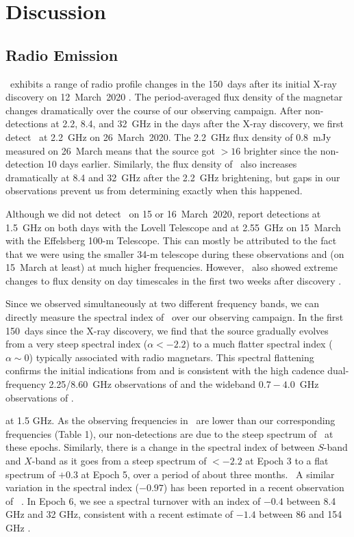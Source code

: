 \documentclass[twocolumn]{emulateapj}
\begin{document}
\section{Discussion}
\label{sec:discussion}
\subsection{Radio Emission}
\label{ssec:radio_em}
\jmag\ exhibits a range of radio profile changes in the 
150~days after its initial X-ray discovery on 12~March~2020 
\citep{esposito20}.  The period-averaged flux density of 
the magnetar changes dramatically over the course of our 
observing campaign.  After non-detections at 2.2, 8.4, 
and 32~GHz in the days after the X-ray discovery, we 
first detect \jmag\ at 2.2~GHz on 26~March~2020.  The 
2.2~GHz flux density of 0.8~mJy measured on 26~March 
means that the source got $>\!\!16$ brighter since the 
non-detection 10 days earlier.  Similarly, the flux 
density of \jmag\ also increases dramatically at 8.4 and 
32~GHz after the 2.2~GHz brightening, but gaps in our 
observations prevent us from determining exactly when this 
happened.

Although we did not detect \jmag\ on 15 or 16~March~2020, 
\citet{champion2020} report detections at 1.5~GHz on both 
days with the Lovell Telescope and at 2.55~GHz on 15~March 
with the Effelsberg 100-m Telescope.  This can mostly be 
attributed to the fact that we were using the smaller 34-m 
telescope during these observations and (on 15~March at least) 
at much higher frequencies.  However, \jmag\ also showed 
extreme changes to flux density on day timescales in the first 
two weeks after discovery \citep{champion2020}.

Since we observed simultaneously at two different frequency 
bands, we can directly measure the spectral index of \jmag\ 
over our observing campaign.  In the first 150~days since 
the X-ray discovery, we find that the source gradually 
evolves from a very steep spectral index ($\alpha < -2.2$) 
to a much flatter spectral index ($\alpha \sim 0$) typically 
associated with radio magnetars.  This spectral flattening 
confirms the initial indications from \citet{champion2020} 
and is consistent with the high cadence dual-frequency 
2.25/8.60~GHz observations of \citet{huang2021} and the 
wideband $0.7-4.0$~GHz observations of \citet{lower2021}. 





at 1.5 GHz. As the observing frequencies in \cite{champion2020} are lower than our 
corresponding frequencies (Table 1), our non-detections are due to the steep spectrum 
of \jmag\ at these epochs. Similarly, there is a change in the spectral index of \jmag 
between $S$-band and $X$-band as it goes from a steep spectrum of $< -2.2$ at Epoch 3 
to a flat spectrum of $+0.3$ at Epoch 5, over a period of about three months.  
A similar variation in the spectral index ($-0.97$) has been reported in a recent 
observation of \jmag\ \citep{Liu2020}. In Epoch 6, we see a spectral turnover with 
an index of $-0.4$ between 8.4 GHz and 32 GHz, consistent with a recent estimate 
of $-1.4$ between 86 and 154 GHz \citep{Torne2020}. 
\end{document}

